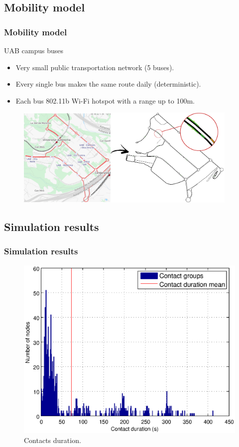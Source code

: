 \documentclass[compress,red]{beamer}
\begin{document}
\subsection{Mobility model}
\begin{frame}
\frametitle{Mobility model}
\begin{block}{UAB campus buses}
\begin{itemize}
\item Very small public transportation network (5 buses).
\item Every single bus makes the same route daily (deterministic).
\item Each bus 802.11b Wi-Fi hotspot with a range up to 100m.
\end{itemize}
\end{block}
\begin{figure}
\includegraphics[width=0.95\textwidth]{../paper/imgs/presentation/process}
\end{figure}
\end{frame}

\subsection{Simulation results}
\begin{frame}
\frametitle{Simulation results}
\begin{figure}
\centering \includegraphics[width=.7\linewidth]{../paper/imgs/statistics/contacts-duration}
\caption{Contacts duration.}
\end{figure}
\end{frame}
\end{document}
